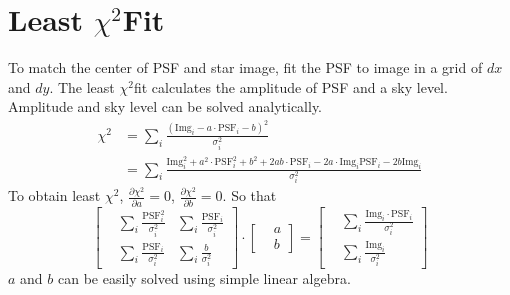 \documentclass[paper=letter, fontsize=11pt]{scrartcl} %
\numberwithin{equation}{section} %
\numberwithin{figure}{section} %
\numberwithin{table}{section} %
\newcommand{\chisq}{\ensuremath{\chi^2}}
\begin{document}
\section{Least \chisq Fit}

To match the center of PSF and star image, fit the PSF to image in a
grid of $dx$ and $dy$. The least \chisq fit calculates the amplitude
of PSF and a sky level. Amplitude and sky level can be solved
analytically.
\newcommand{\PSF}{\ensuremath{\mathrm{PSF}}}
\newcommand{\Img}{\ensuremath{\mathrm{Img}}}
\begin{equation}
  \begin{split}
    \chisq &= \sum_{i} \frac{(\mathrm{Img}_{i} - a\cdot\mathrm{PSF}_{i} -
      b)^{2}}{\sigma_{i}^{2}}\\
    &= \sum_{i} \frac{\mathrm{Img}_{i}^{2}+a^{2}\cdot \mathrm{PSF}_{i}^{2}+b^{2}+2ab\cdot \mathrm{PSF}_{i}
      -2a\cdot \mathrm{Img}_{i}\PSF_{i}-2b \mathrm{Img}_{i}}{\sigma_{i}^{2}}
  \end{split}
    \label{eq:chisq}
\end{equation}
To obtain least \chisq, $\frac{\partial \chisq}{\partial a} = 0$,
$\frac{\partial \chisq}{\partial b}=0$. So that
\begin{equation}
  \label{eq:calchisq}
  \begin{bmatrix}
    &\sum_{i}\frac{\PSF_{i}^{2}}{\sigma_{i}^{2}}
    &\sum_{i}\frac{\PSF_{i}}{\sigma_{i}^{2}}\\
    &\sum_{i}\frac{\PSF_{i}}{\sigma_{i}^{2}}
    &\sum_{i}\frac{b}{\sigma_{i}^{2}}
  \end{bmatrix}
  \cdot
  \begin{bmatrix}
    &a\\
    &b
  \end{bmatrix}
  =
  \begin{bmatrix}
    &\sum_{i}\frac{\Img_{i}\cdot\PSF_{i}}{\sigma_{i}^{2}}\\
    &\sum_{i}\frac{\Img_{i}}{\sigma_{i}^{2}}
  \end{bmatrix}
\end{equation}
$a$ and $b$ can be easily solved using simple linear algebra.
\end{document}
